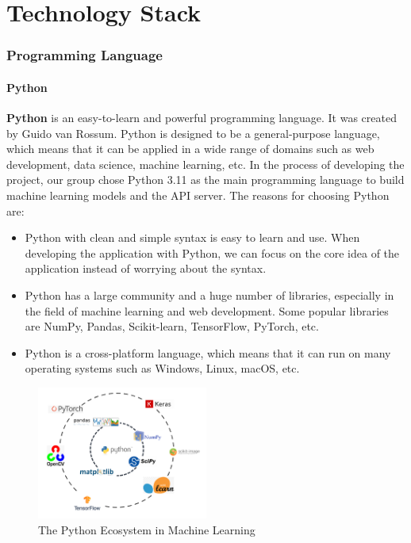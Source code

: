\chapter{Technology Stack}

\subsection{Programming Language}

\subsubsection{Python}
\textbf{Python} is an easy-to-learn and powerful programming language. It was created by Guido van Rossum. Python is designed to be a general-purpose language, which means that it can be applied in a wide range of domains such as web development, data science, machine learning, etc. In the process of developing the project, our group chose Python 3.11 as the main programming language to build machine learning models and the API server. The reasons for choosing Python are:
\begin{itemize}
    \item Python with clean and simple syntax is easy to learn and use. When developing the application with Python, we can focus on the core idea of the application instead of worrying about the syntax.
    \item Python has a large community and a huge number of libraries, especially in the field of machine learning and web development. Some popular libraries are NumPy, Pandas, Scikit-learn, TensorFlow, PyTorch, etc.
    \item Python is a cross-platform language, which means that it can run on many operating systems such as Windows, Linux, macOS, etc.
\end{itemize}

\begin{figure}[ht]
    \centering
    \includegraphics[width=0.5\textwidth]{../Images/8.Technology_Stack/python_ecosystem.png}
    \caption{The Python Ecosystem in Machine Learning}
    \label{fig:python_ecosystem}
\end{figure}

